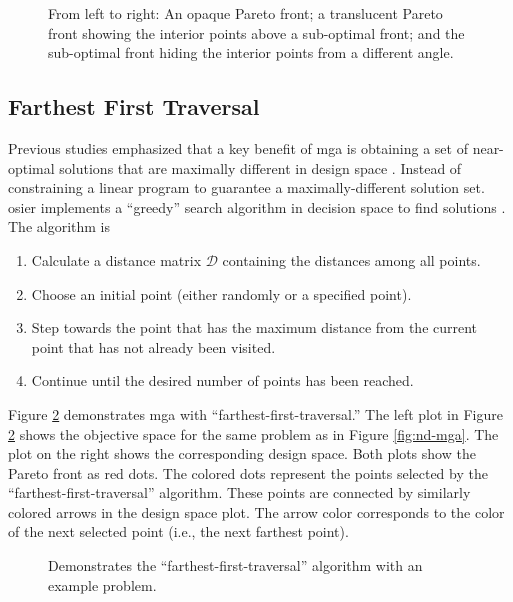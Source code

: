 \begin{figure}[H]
  \centering
  \resizebox{1\columnwidth}{!}{}
  \caption{From left to right: An opaque Pareto front; a translucent Pareto front 
  showing the interior points above a sub-optimal front; and the sub-optimal front 
  hiding the interior points from a different angle.}
  \label{fig:3d-mga}
\end{figure}

\subsection{Farthest First Traversal}
Previous studies emphasized that a key benefit of \ac{mga} is
obtaining a set of near-optimal solutions that are maximally different in design
space \cite{decarolis_modelling_2016, yue_review_2018-1}. Instead of
constraining a linear program to guarantee a maximally-different solution set.
\ac{osier} implements a ``greedy'' search algorithm in decision space to find
solutions \cite{hochbaum_best_1985}. The algorithm is
\begin{enumerate}
  \item Calculate a distance matrix $\mathcal{D}$ containing the distances among
  all points. 
  \item Choose an initial point (either randomly or a specified point).
  \item Step towards the point that has the maximum distance from the current
  point that has not already been visited.
  \item Continue until the desired number of points has been reached.
\end{enumerate}

Figure \ref{fig:mga-fft} demonstrates \ac{mga} with
``farthest-first-traversal.'' The left plot in Figure \ref{fig:mga-fft} shows
the objective space for the same problem as in Figure \ref{fig:nd-mga}. The plot
on the right shows the corresponding design space. Both plots show the Pareto
front as red dots. The colored dots represent the points selected by the ``farthest-first-traversal''
algorithm. These points are connected by similarly colored arrows in the design space plot. The arrow
color corresponds to the color of the next selected point (i.e., the next farthest point).

\begin{figure}[H]
  \centering
  \resizebox{1\columnwidth}{!}{}
  \caption{Demonstrates the ``farthest-first-traversal'' algorithm with an example problem.}
  \label{fig:mga-fft}
\end{figure}
